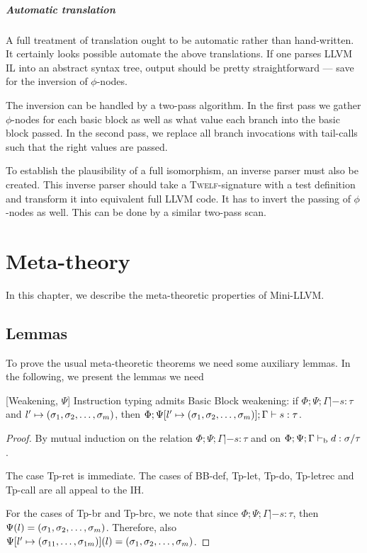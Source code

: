 \documentclass[a4paper, oneside, 10pt, draft]{memoir}
\newcommand{\twelf}{\textsc{Twelf}}
\begin{document}
\paragraph{Automatic translation}

A full treatment of translation ought to be automatic rather than
hand-written. It certainly looks possible automate the above
translations. If one parses LLVM IL into an abstract syntax tree,
output should be pretty straightforward --- save for the inversion of
$\phi$-nodes.

The inversion can be handled by a two-pass algorithm. In the first
pass we gather $\phi$-nodes for each basic block as well as what value
each branch into the basic block passed. In the second pass, we
replace all branch invocations with tail-calls such that the right
values are passed.

To establish the plausibility of a full isomorphism, an inverse parser
must also be created. This inverse parser should take a
\twelf{}-signature with a test definition and transform it into
equivalent full LLVM code. It has to invert the passing of
$\phi$-nodes as well. This can be done by a similar two-pass scan.

\chapter{Meta-theory}

In this chapter, we describe the meta-theoretic properties of
Mini-LLVM.

\section{Lemmas}

To prove the usual meta-theoretic theorems we need some auxiliary
lemmas. In the following, we present the lemmas we need

\begin{lem}{[Weakening, $\Psi$]}
  \label{lem:weaken-psi}
  Instruction typing admits Basic Block weakening: if $\Phi;\Psi;\Gamma
  |- s : \tau$ and $l' \mapsto (\sigma_1, \sigma_2, \dotsc, \sigma_m)$, then $\Phi;\Psi[l' \mapsto
  (\sigma_1, \sigma_2, \dotsc, \sigma_m)];\Gamma |- s : \tau$.
\end{lem}
\begin{proof}
  By mutual induction on the relation $\Phi;\Psi;\Gamma |- s : \tau$
  and on $\Phi;\Psi;\Gamma |-_{\mathrm{b}} d : \sigma / \tau$.

  The case Tp-ret is immediate. The cases of BB-def, Tp-let, Tp-do,
  Tp-letrec and Tp-call are all appeal to the IH.

  For the cases of Tp-br and Tp-brc, we note that since
  $\Phi;\Psi;\Gamma |- s : \tau$, then $\Psi(l) =
  (\sigma_1, \sigma_2, \dotsc, \sigma_m)$. Therefore, also $\Psi[l' \mapsto (\sigma_{11}, \dotsc,
  \sigma_{1m})](l) = (\sigma_1, \sigma_2, \dotsc, \sigma_m)$.
\end{proof}
\end{document}
